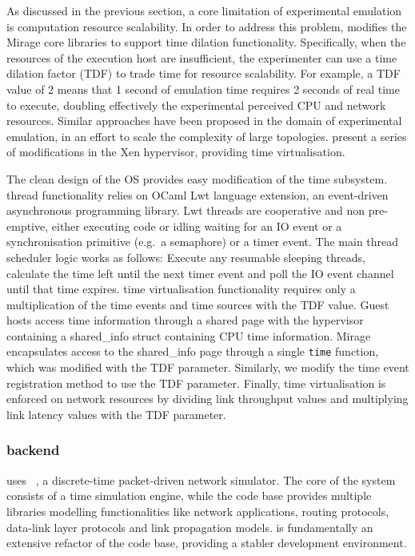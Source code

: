 As discussed in the previous section, a core limitation of experimental
emulation is computation resource scalability. In order to address this problem,  
\sdnsim modifies the Mirage core libraries to support time
dilation functionality.  Specifically, when the resources of the execution host
are insufficient, the experimenter can use a time dilation factor (TDF) to trade
time for resource scalability. For example, a TDF value of 2 means that 1 second
of emulation time requires 2 seconds of real time to execute, doubling
effectively the experimental perceived CPU and network resources. Similar
approaches have been proposed in the domain of experimental emulation, in an
effort to scale the complexity of large topologies.   present a
series of modifications in the Xen hypervisor, providing time virtualisation.

The clean design of the \mirage OS provides easy modification of the time
subsystem. \mirage thread functionality relies on OCaml Lwt language extension,
an event-driven asynchronous programming library.  Lwt threads are cooperative
and non pre-emptive, either executing code or idling waiting for an IO event or a
synchronisation primitive (e.g.~a semaphore) or a timer event. The main thread
scheduler logic works as follows: Execute any resumable sleeping threads,
calculate the time left until the next timer event and poll the IO event channel
until that time expires. \sdnsim time virtualisation functionality requires only
a multiplication of the time events and time sources with the TDF value.  Guest
hosts access time information through a shared page with the hypervisor
containing a shared\_info struct containing CPU time information. Mirage
encapsulates access to the shared\_info page through a single \texttt{time}
function, which was modified with the TDF parameter. Similarly, we modify the
time event registration method to use the TDF parameter. Finally, time
virtualisation is enforced on network resources by dividing link throughput
values and multiplying link latency values with the TDF parameter. 

\subsubsection{ backend}

\sdnsim uses ~, a discrete-time packet-driven network
simulator. The core of the system consists
of a time simulation engine, while the code base provides multiple libraries
modelling functionalities like network applications, routing protocols,
data-link layer protocols and link propagation models.  is fundamentally
an extensive refactor of the  code base, providing a stabler development
environment. 

